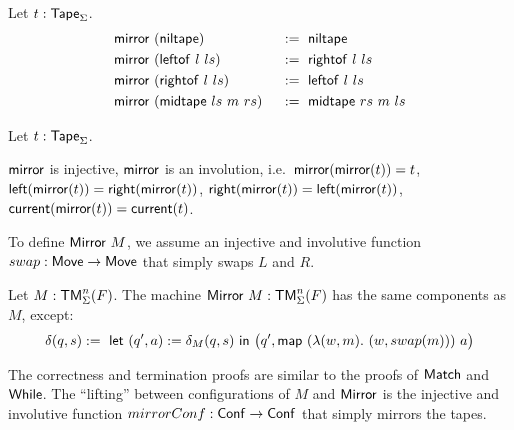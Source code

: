 %
\begin{definition}
  \label{def:mirror_tape}
  Let $t : \mathsf{Tape}_\Sigma$.
  \begin{alignat*}{2}
    & \mathsf{mirror}~(\mathsf{niltape})         &&~:=~ \mathsf{niltape} \\
    & \mathsf{mirror}~(\mathsf{leftof}~l~ls)     &&~:=~ \mathsf{rightof}~l~ls \\
    & \mathsf{mirror}~(\mathsf{rightof}~l~ls)    &&~:=~ \mathsf{leftof}~l~ls \\
    & \mathsf{mirror}~(\mathsf{midtape}~ls~m~rs) &&~:=~ \mathsf{midtape}~rs~m~ls
  \end{alignat*}
\end{definition}
\begin{lemma}
  \label{lem:mirror}
  Let $t:\mathsf{Tape}_\Sigma$.
  \begin{enumerate}
   \label{lem:mirror_tape_injective}
    $\mathsf{mirror}$ is injective,
   \label{lem:mirror_tape_involution}
    $\mathsf{mirror}$ is an involution, i.e.\ $\mathsf{mirror}(\mathsf{mirror}(t))=t$,
   \label{lem:mirror_left}
    $\mathsf{left}(\mathsf{mirror}(t)) = \mathsf{right}(\mathsf{mirror}(t))$,
   \label{lem:mirror_right}
    $\mathsf{right}(\mathsf{mirror}(t)) = \mathsf{left}(\mathsf{mirror}(t))$,
   \label{lem:mirror_current}
    $\mathsf{current}(\mathsf{mirror}(t)) = \mathsf{current}(t)$.
  \end{enumerate}
\end{lemma}


To define $\MS{Mirror}~M$, we assume an injective and involutive function $swap:\mathsf{Move} \rightarrow \mathsf{Move}$ that simply swaps $L$ and $R$.
%
\begin{definition}[$\MS{Mirror}~M$][Mirror]
  \label{def:Mirror}
  Let $M:\mathsf{TM}_\Sigma^n(F)$.  The machine $\mathsf{Mirror}~M : \mathsf{TM}_\Sigma^n(F)$ has the same components as $M$, except:
  \[
    \delta(q, s) :=~
    \mathsf{let}~(q', a) := \delta_M(q,s)~\mathsf{in}~\bigl(q', \mathsf{map}~(\lambda(w, m).~(w, swap(m)))~a \bigr)
  \]
\end{definition}

The correctness and termination proofs are similar to the proofs of $\mathsf{Match}$ and $\mathsf{While}$.  The ``lifting'' between configurations of $M$ and
$\mathsf{Mirror}$ is the injective and involutive function $mirrorConf : \mathsf{Conf} \rightarrow \mathsf{Conf}$ that simply mirrors the tapes.

